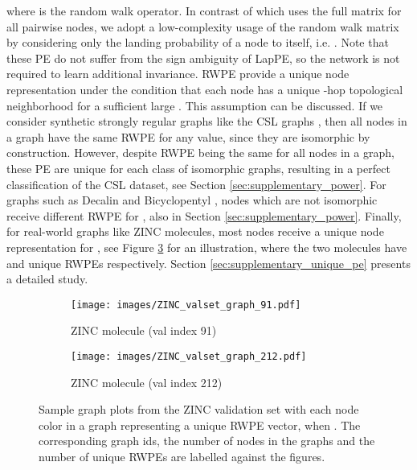 \documentclass{article} \usepackage{iclr2021_conference,times}
\begin{document}
where  is the random walk operator. In contrast of \cite{li2020distance} which uses the full matrix  for all pairwise nodes, we adopt a low-complexity usage of the random walk matrix by considering only the landing probability of a node  to itself, i.e. . Note that these PE do not suffer from the sign ambiguity of LapPE, so the network is not required to learn additional invariance.
RWPE provide a unique node representation under the condition that each node has a unique -hop topological neighborhood for a sufficient large . This assumption can be discussed. If we consider synthetic strongly regular graphs like the CSL graphs \citep{murphy2019relational}, then all nodes in a graph have the same RWPE for any  value, since they are isomorphic by construction. However, despite RWPE being the same for all nodes in a graph, these PE are unique for each class of isomorphic graphs,  resulting in a perfect classification of the CSL dataset, see Section \ref{sec:supplementary_power}.
For graphs such as Decalin and Bicyclopentyl \citep{sato2020survey}, nodes which are not isomorphic receive different RWPE for , also in Section \ref{sec:supplementary_power}. Finally, for real-world graphs like ZINC molecules, most nodes receive a unique node representation for , see Figure \ref{fig:uniqueness_RWPE_graphs_main} for an illustration, where the two molecules have  and  unique RWPEs respectively. Section \ref{sec:supplementary_unique_pe} presents a detailed study.




\begin{figure}[!t]
\centering
  \begin{subfigure}{0.36\linewidth}
  \centering
    \texttt{[image: images/ZINC\_valset\_graph\_91.pdf]}
    \vspace{-14pt}
    \caption{ZINC molecule (val index 91)}
    \label{fig:graph_id_91}
  \end{subfigure}
\begin{subfigure}{0.36\linewidth}
  \centering
    \texttt{[image: images/ZINC\_valset\_graph\_212.pdf]}
    \vspace{-14pt}
    \caption{ZINC molecule (val index 212)}
    \label{fig:graph_id_212}
  \end{subfigure}
  \vspace{-5pt}
  \caption{Sample graph plots from the ZINC validation set with each node color in a graph representing a unique RWPE vector, when . The corresponding graph ids, the number of nodes in the graphs and the number of unique RWPEs are labelled against the figures.}
  \label{fig:uniqueness_RWPE_graphs_main}
\end{figure}
\end{document}
